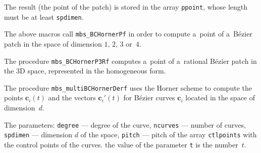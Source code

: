 The result (the point of the patch) is stored in the array
\texttt{ppoint}, whose length must be at least \texttt{spdimen}.

\vspace{\bigskipamount}
\begin{sloppypar}
The above macros call \texttt{mbs\_BCHornerPf} in order to compute
a~point of a~B\'{e}zier patch in the space of dimension
$1$, $2$, $3$ or~$4$.
\end{sloppypar}

\vspace{\bigskipamount}
The procedure \texttt{mbs\_BCHornerP3Rf} computes a~point of a~rational
B\'{e}zier patch in the $3$D space, represented in the homogeneous form.

\vspace{\bigskipamount}
\begin{sloppypar}
The procedure \texttt{mbs\_multiBCHornerDerf} uses the Horner scheme
to compute the points $\bm{c}_i(t)$ and the vectors $\bm{c}_i'(t)$
for B\'{e}zier curves $\bm{c}_i$ located in the space of dimension~$d$.
\end{sloppypar}

The parameters: \texttt{degree} --- degree of the curve, \texttt{ncurves}
--- number of curves, \texttt{spdimen} --- dimension $d$ of the space,
\texttt{pitch} --- pitch of the array \texttt{ctlpoints} with the control
points of the curves. the value of the parameter \texttt{t}
is the number~$t$.

